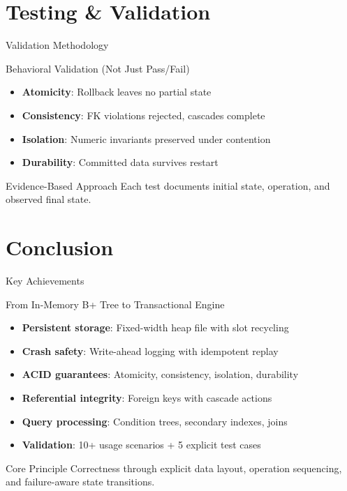 \documentclass[aspectratio=169]{beamer}
\begin{document}
\section{Testing \& Validation}

\begin{frame}{Validation Methodology}
\begin{block}{Behavioral Validation (Not Just Pass/Fail)}
\begin{itemize}
  \item \textbf{Atomicity}: Rollback leaves no partial state
  \item \textbf{Consistency}: FK violations rejected, cascades complete
  \item \textbf{Isolation}: Numeric invariants preserved under contention
  \item \textbf{Durability}: Committed data survives restart
\end{itemize}
\end{block}

\begin{alertblock}{Evidence-Based Approach}
Each test documents initial state, operation, and observed final state.
\end{alertblock}
\end{frame}

\section{Conclusion}

\begin{frame}{Key Achievements}
\begin{block}{From In-Memory B+ Tree to Transactional Engine}
\begin{itemize}
  \item \textbf{Persistent storage}: Fixed-width heap file with slot recycling
  \item \textbf{Crash safety}: Write-ahead logging with idempotent replay
  \item \textbf{ACID guarantees}: Atomicity, consistency, isolation, durability
  \item \textbf{Referential integrity}: Foreign keys with cascade actions
  \item \textbf{Query processing}: Condition trees, secondary indexes, joins
  \item \textbf{Validation}: 10+ usage scenarios + 5 explicit test cases
\end{itemize}
\end{block}

\begin{alertblock}{Core Principle}
Correctness through explicit data layout, operation sequencing, and failure-aware state transitions.
\end{alertblock}
\end{frame}
\end{document}
